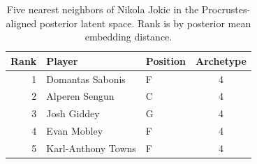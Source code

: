 \begin{table}[htbp]
  \centering\small
  \begin{tabular}{rllc}
    \toprule
    Rank & Player & Position & Archetype \\
    \midrule
    1 & Domantas Sabonis & F & 4 \\
    2 & Alperen Sengun & C & 4 \\
    3 & Josh Giddey & G & 4 \\
    4 & Evan Mobley & F & 4 \\
    5 & Karl-Anthony Towns & F & 4 \\
    \bottomrule
  \end{tabular}
  \caption{Five nearest neighbors of Nikola Jokic in the Procrustes-aligned posterior latent space. Rank is by posterior mean embedding distance.}
  \label{tab:Nikola_Jokic_neighbors}
\end{table}

